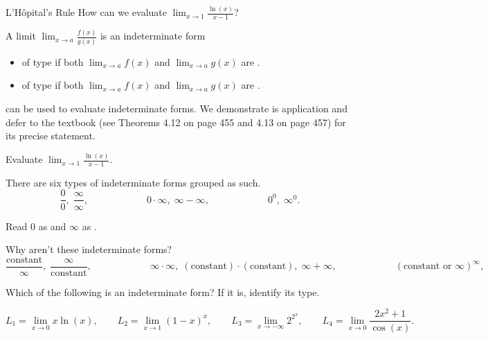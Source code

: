 \documentclass[../main.tex]{subfiles}
\begin{document}
\begin{lesson}{L'H\^opital's Rule}
  How can we evaluate \(\lim_{x \to 1} \frac{\ln(x)}{x - 1}\)?

  A limit \(\lim_{x \to a} \frac{f(x)}{g(x)}\) is an indeterminate form 
  \begin{itemize}
    \item of type \underline{\hspace{1in}} if both \(\lim_{x \to a} f(x)\) and \(\lim_{x \to a} g(x)\) are \underline{\hspace{1in}}.
    \item of type \underline{\hspace{1in}} if both \(\lim_{x \to a} f(x)\) and \(\lim_{x \to a} g(x)\) are \underline{\hspace{1in}}.
  \end{itemize}
   can be used to evaluate indeterminate forms. We demonstrate is application and defer to the textbook (see Theorems 4.12 on page 455 and 4.13 on page 457) for its precise statement.
  
  \begin{example}
    Evaluate \(\lim_{x \to 1} \frac{\ln(x)}{x - 1}\).
  \end{example}

  There are six types of indeterminate forms grouped as such.
  \[
    \frac{0}{0},\; \frac{\infty}{\infty}, \hspace{1in} 0 \cdot \infty,\; \infty - \infty, \hspace{1in} 0^{0}, \; \infty^{0}.
  \]

  Read \(0\) as \underline{\hspace{3in}} and \(\infty\) as \underline{\hspace{3in}}. 

  Why aren't these indeterminate forms?
  \[
    \frac{\text{constant}}{\infty},\; \frac{\infty}{\text{constant}}, \hspace{1in} \infty \cdot \infty,\; (\text{constant}) \cdot (\text{constant}),\; \infty + \infty, \hspace{1in} (\text{constant} \text{ or } \infty)^{\infty}, 
  \]
  
  \begin{example}
    Which of the following is an indeterminate form? If it is, identify its type. 

    \[
      L_{1} = \lim_{x \to 0} x \ln(x),
      \qquad
      L_{2} = \lim_{x \to 1} (1-x)^{x},
      \qquad
      L_{3} = \lim_{x \to -\infty} 2^{2^{x}},
      \qquad
      L_{4} = \lim_{x \to 0} \frac{2x^{2}+1}{\cos(x)}.
    \]
  \end{example}


\end{lesson}
\end{document}

